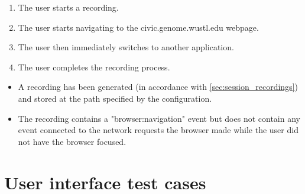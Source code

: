 \begin{tests}
    {\begin{enumerate}
        \item The \gls{user} starts a recording.
        \item The \gls{user} starts navigating to the civic.genome.wustl.edu webpage.
        \item The \gls{user} then immediately switches to another application.
        \item The \gls{user} completes the recording process.
    \end{enumerate}}
    {\begin{itemize}
        \item A recording has been generated (in accordance with \ref{sec:session_recordings}) and stored at the path specified by the configuration.
        \item The recording contains a "browser:navigation" \gls{event} but does not contain any \gls{event} connected to the network requests the \gls{browser} made while the \gls{user} did not have the \gls{browser} focused.
    \end{itemize}}
\end{tests}

\newpage
\section{User interface test cases}

